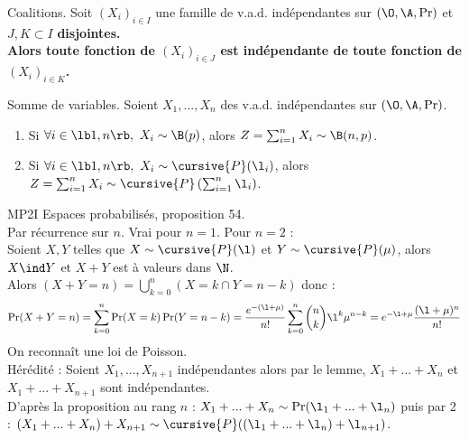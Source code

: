 \documentclass[11pt]{article}
\begin{document}
\begin{lemme}{Coalitions.}{}
    Soit $(X_i)_{i\in I}$ une famille de v.a.d. indépendantes sur $(\O,\A,\Pr)$ et $J,K\subset I$ \bf{disjointes}.\\
    Alors toute fonction de $(X_i)_{i\in J}$ est indépendante de toute fonction de $(X_i)_{i\in K}$.
\end{lemme}

\begin{prop}{Somme de variables.}{}
    Soient $X_1,...,X_n$ des v.a.d. indépendantes sur $(\O,\A,\Pr)$.
    \begin{enumerate}
        \item Si $\forall i \in \lb1,n\rb, ~ X_i \sim \B(p)$, alors $Z=\sum_{i=1}^n X_i \sim \B(n,p)$.
        \item Si $\forall i \in \lb1,n\rb, ~ X_i \sim \cursive{P}(\l_i)$, alors $Z=\sum_{i=1}^nX_i \sim \cursive{P}\left( \sum_{i=1}^n \l_i \right)$.
    \end{enumerate}
    \tcblower
     MP2I Espaces probabilisés, proposition 54.\\
     Par récurrence sur $n$. Vrai pour $n=1$. Pour $n=2$ :\\
    Soient $X,Y$ telles que $X\sim\cursive{P}(\l)$ et $Y\sim\cursive{P}(\mu)$, alors $X\ind Y$ et $X+Y$ est à valeurs dans $\N$.\\
    Alors $(X+Y = n) = \bigcup_{k=0}^n(X = k \cap Y = n - k)$ donc : \begin{equation*} \Pr(X+Y=n)=\sum_{k=0}^n\Pr(X=k)\Pr(Y=n-k)=\frac{e^{-(\l+\mu)}}{n!}\sum_{k=0}^n\binom{n}{k}\l^k\mu^{n-k} = e^{-\l + \mu} \frac{(\l+\mu)^n}{n!} \end{equation*}
    On reconnaît une loi de Poisson.\\
    Hérédité : Soient $X_1,...,X_{n+1}$ indépendantes alors par le lemme, $X_1+...+X_n$ et $X_1+...+X_{n+1}$ sont indépendantes.\\
    D'après la proposition au rang $n$ : $X_1+...+X_n \sim \Pr(\l_1+...+\l_n)$ puis par 2 : $(X_1+...+X_n)+X_{n+1}\sim\cursive{P}((\l_1+...+\l_n) + \l_{n+1})$.
\end{prop}

\pagebreak
\end{document}
